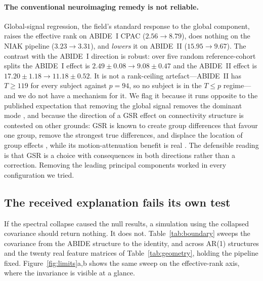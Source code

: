 \documentclass[11pt,a4paper]{article}
\begin{document}
\paragraph{The conventional neuroimaging remedy is not reliable.}
Global-signal regression, the field's standard response to the global
component, raises the effective rank on ABIDE~I CPAC ($2.56\to8.79$), does
nothing on the NIAK pipeline ($3.23\to3.31$), and \emph{lowers} it on
ABIDE~II ($15.95\to9.67$). The contrast with the ABIDE~I direction is
robust: over five random reference-cohort splits the ABIDE~I effect is
$2.49\pm0.08\to9.08\pm0.47$ and the ABIDE~II effect is
$17.20\pm1.18\to11.18\pm0.52$. It is not a rank-ceiling artefact---ABIDE~II
has $T\ge119$ for every subject against $p=94$, so no subject is in the
$T\le p$ regime---and we do not have a mechanism for it. We flag it because
it runs opposite to the published expectation that removing the global
signal removes the dominant mode \citep{moujaes2024ketamine}, and because
the direction of a GSR effect on connectivity structure is contested on
other grounds: GSR is known to create group differences that favour one
group, remove the strongest true differences, and displace the location of
group effects \citep{gotts2013perils,saad2012trouble,ciric2017benchmarking},
while its motion-attenuation benefit is real
\citep{ciric2017benchmarking,murphy2017consensus}. The defensible reading is
that GSR is a choice with consequences in both directions rather than a
correction. Removing the leading principal components worked in every
configuration we tried.

\subsection{The received explanation fails its own test}
\label{sec:boundary}

If the spectral collapse caused the null results, a simulation using the
collapsed covariance should return nothing. It does not.
Table~\ref{tab:boundary} sweeps the covariance from the ABIDE structure to
the identity, and across AR(1) structures and the twenty real feature
matrices of Table~\ref{tab:geometry}, holding the pipeline fixed.
Figure~\ref{fig:limits}a,b shows the same sweep on the effective-rank axis,
where the invariance is visible at a glance.
\end{document}

